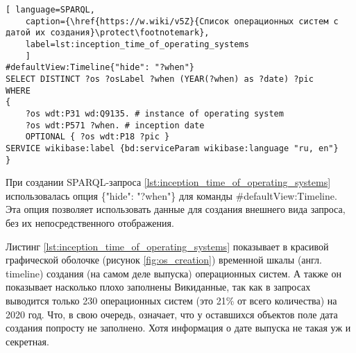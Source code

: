 
\begin{lstlisting}[ language=SPARQL, 
	caption={\href{https://w.wiki/v5Z}{Список операционных систем с датой их создания}\protect\footnotemark},
	label=lst:inception_time_of_operating_systems
	]
#defaultView:Timeline{"hide": "?when"}
SELECT DISTINCT ?os ?osLabel ?when (YEAR(?when) as ?date) ?pic
WHERE
{
	?os wdt:P31 wd:Q9135. # instance of operating system
	?os wdt:P571 ?when. # inception date
	OPTIONAL { ?os wdt:P18 ?pic }
SERVICE wikibase:label {bd:serviceParam wikibase:language "ru, en"}
}
\end{lstlisting}

При создании SPARQL-запроса \ref{lst:inception_time_of_operating_systems} использовалась опция \{"hide": "?when"\} для команды \#defaultView:Timeline\footnotemark.
\marginnote[0.5cm]{}
\marginnote[0.3cm]{}
Эта опция позволяет использовать данные для создания внешнего вида запроса, без их непосредственного отображения\cite{WQSResultViews}.

Листинг \ref{lst:inception_time_of_operating_systems} показывает в красивой графической оболочке (рисунок \ref{fig:os_creation}) временной шкалы (англ. timeline) создания (на самом деле выпуска\footnotemark) операционных систем. А также он показывает насколько плохо заполнены Викиданные, так как в запросах выводится только 230 операционных систем (это 21\% от всего количества) на 2020 год. Что, в свою очередь, означает, что у оставшихся объектов поле дата создания попросту не заполнено. Хотя информация о дате выпуска не такая уж и секретная.

